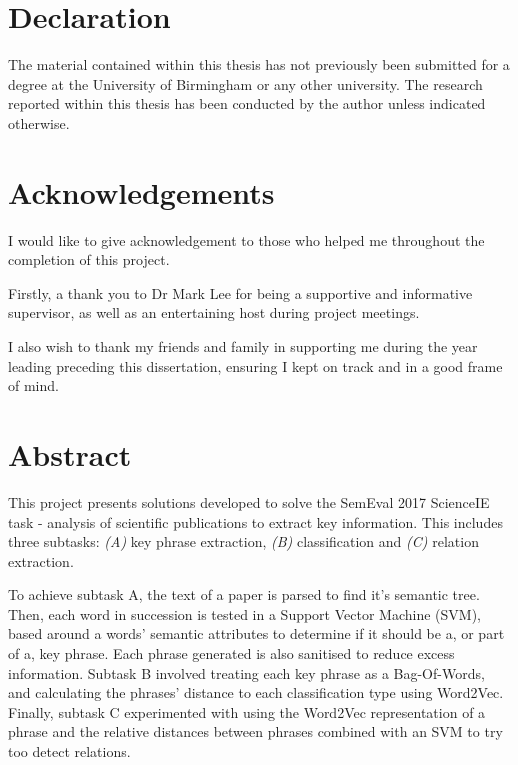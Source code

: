 \documentclass[a4paper]{report}
\begin{document}

\section*{Declaration}
The material contained within this thesis has not previously been submitted for a degree at the University of Birmingham or any other university. The research reported within this thesis has been conducted by the author unless indicated otherwise.

\pagebreak

\section*{Acknowledgements}
I would like to give acknowledgement to those who helped me throughout the completion of this project.

Firstly, a thank you to Dr Mark Lee for being a supportive and informative supervisor, as well as an entertaining host during project meetings.

I also wish to thank my friends and family in supporting me during the year leading preceding this dissertation, ensuring I kept on track and in a good frame of mind.

\pagebreak

\section*{Abstract}
This project presents solutions developed to solve the SemEval 2017 ScienceIE task - analysis of scientific publications to extract key information. This includes three subtasks: \textit{(A)} key phrase extraction, \textit{(B)} classification and \textit{(C)} relation extraction.

To achieve subtask A, the text of a paper is parsed to find it's semantic tree. Then, each word in succession is tested in a Support Vector Machine (SVM), based around a words' semantic attributes to determine if it should be a, or part of a, key phrase. Each phrase generated is also sanitised to reduce excess information. Subtask B involved treating each key phrase as a Bag-Of-Words, and calculating the phrases' distance to each classification type using Word2Vec. Finally, subtask C experimented with using the Word2Vec representation of a phrase and the relative distances between phrases combined with an SVM to try too detect relations.
\end{document}
